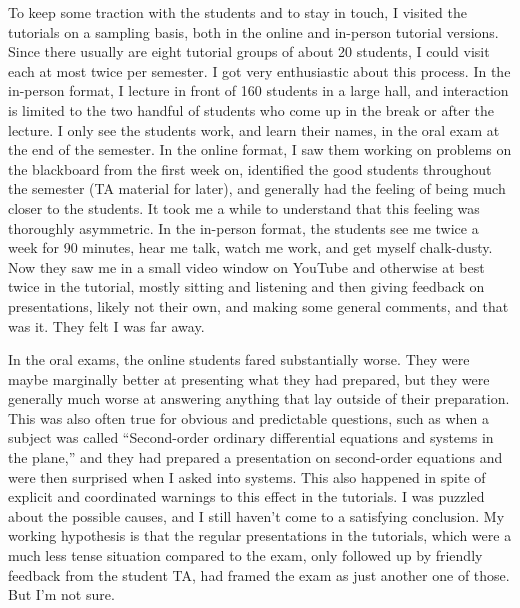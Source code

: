 \documentclass[graybox]{svmult}
\begin{document}
To keep some traction with the students and to stay in touch, I visited the tutorials on a sampling basis, both in the online and in-person tutorial versions. Since there usually are eight tutorial groups of about 20 students, I could visit each at most twice per semester. I got very enthusiastic about this process. In the in-person format, I lecture in front of 160 students in a large hall, and interaction is limited to the two handful of students who come up in the break or after the lecture. I only see the students work, and learn their names, in the oral exam at the end of the semester. In the online format, I saw them working on problems on the blackboard from the first week on, identified the good students  throughout the semester (TA material for later), and generally had the feeling of being much closer to the students. It took me a while to understand that this feeling was thoroughly asymmetric. In the in-person format, the students see me twice a week for 90 minutes, hear me talk, watch me work, and get myself chalk-dusty. Now they saw me in a small video window on YouTube and otherwise at best twice in the tutorial, mostly sitting and listening and then giving feedback on presentations, likely not their own, and making some general comments, and that was it. They felt I was far away.

In the oral exams, the online students fared substantially worse. They were maybe marginally better at presenting what they had prepared, but they were generally much worse at answering anything that lay outside of their preparation. This was also often true for obvious and predictable questions, such as when a subject was called ``Second-order ordinary differential equations and systems in the plane,'' and they had prepared a presentation on second-order equations and were then surprised when I asked into systems. This also happened in spite of explicit and coordinated warnings to this effect in the tutorials. I was puzzled about the possible causes, and I still haven't come to a satisfying conclusion. My working hypothesis is that the regular presentations in the tutorials, which were a much less tense situation compared to the exam, only followed up by friendly feedback from the student TA, had framed the exam as just another one of those. But I'm not sure.
\end{document}
